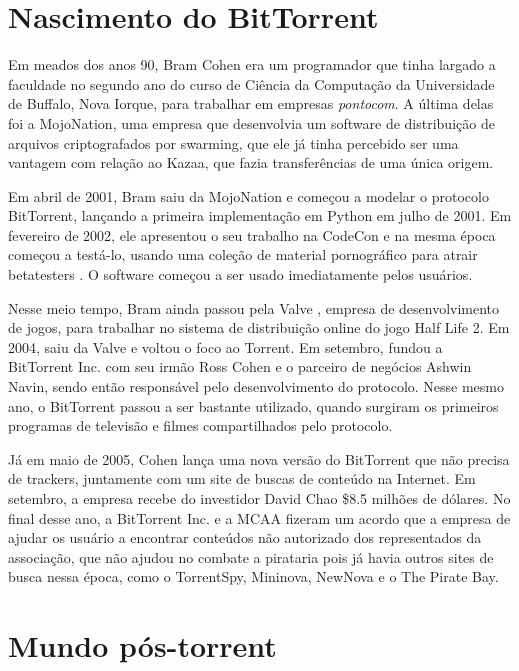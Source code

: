 \section{Nascimento do BitTorrent}

Em meados dos anos 90, Bram Cohen era um programador que tinha largado a faculdade no
segundo ano do curso de Ciência da Computação da Universidade de Buffalo, Nova Iorque,
para trabalhar em empresas \emph{pontocom}. A última delas foi a MojoNation, uma
empresa que desenvolvia um software de distribuição de arquivos criptografados por
\gls*{swarming}, que ele já tinha percebido ser uma vantagem com relação ao Kazaa, que
fazia transferências de uma única origem.

Em abril de 2001, Bram saiu da MojoNation e começou a modelar o protocolo BitTorrent,
lançando a primeira implementação em Python em julho de 2001. Em fevereiro de 2002, ele
apresentou o seu trabalho na CodeCon \cite{site:codecon} e na mesma época começou a
testá-lo, usando uma coleção de material pornográfico para atrair \glspl{betatester}
\cite{site:bramcohen}. O software começou a ser usado imediatamente pelos usuários.

Nesse meio tempo, Bram ainda passou pela Valve \cite{wiki:bramcohen}, empresa de
desenvolvimento de jogos, para trabalhar no sistema de distribuição online do jogo
Half Life 2. Em 2004, saiu da Valve e voltou o foco ao Torrent. Em setembro, fundou a
BitTorrent Inc. com seu irmão Ross Cohen e o parceiro de negócios Ashwin Navin,
sendo então responsável pelo desenvolvimento do protocolo. Nesse mesmo ano, o
BitTorrent passou a ser bastante utilizado, quando surgiram os primeiros programas de
televisão e filmes compartilhados pelo protocolo.

Já em maio de 2005, Cohen lança uma nova versão do BitTorrent que não precisa de
\glspl{tracker}, juntamente com um site de buscas de conteúdo na Internet. Em setembro,
a empresa recebe do investidor David Chao \$8.5 milhões de dólares. No final desse ano,
a BitTorrent Inc. e a MCAA \cite{wiki:mcaa} fizeram um acordo que a empresa de ajudar os
usuário a encontrar conteúdos não autorizado dos representados da associação, que não
ajudou no combate a pirataria pois já havia outros sites de busca nessa época, como o
TorrentSpy, Mininova, NewNova e o The Pirate Bay.

\section{Mundo pós-torrent}

